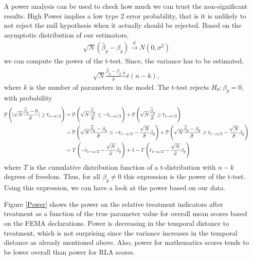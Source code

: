 A power analysis can be used to check how much we can trust the non-significant results. High Power implies a low type 2 error probability, that is it is unlikely to not reject the null hypothesis when it actually should be rejected. Based on the asymptotic distribution of our estimators,
\begin{align*}
	\sqrt{N} (\widehat{\beta}_{g} - \beta_{g}) \overset{d}{\to} N(0, \sigma^2)
\end{align*}
we can compute the power of the t-test. Since, the variance has to be estimated, 
\begin{align*}
	\sqrt{N} \frac{\widehat{\beta}_{g} - \beta_{g}}{\widehat{\sigma}} \overset{a}{\sim} t(n-k),
\end{align*}
where $k$ is the number of parameters in the model. The t-test rejects $H_0: \beta_g = 0$, with probability
\begin{align*}
	\mathbb{P} \left( \lvert \sqrt{N} \frac{\widehat{\beta}_{g} - 0}{\widehat{\sigma}} \rvert \geq t_{1-\alpha/2}  \right) &= \mathbb{P} \left(  \sqrt{N} \frac{\widehat{\beta}_{g}}{\widehat{\sigma}}  \leq -t_{1-\alpha/2}  \right) + \mathbb{P} \left( \sqrt{N} \frac{\widehat{\beta}_{g}}{\widehat{\sigma}} \geq t_{1-\alpha/2}  \right) \\
	&= \mathbb{P} \left(  \sqrt{N} \frac{\widehat{\beta}_{g} - \beta_g}{\widehat{\sigma}}  \leq -t_{1-\alpha/2} - \frac{\sqrt{N}}{\widehat{\sigma}} \beta_{g}  \right) + \mathbb{P} \left( \sqrt{N} \frac{\widehat{\beta}_{g} - \beta_g}{\widehat{\sigma}} \geq t_{1-\alpha/2}  - \frac{\sqrt{N}}{\widehat{\sigma}} \beta_{g} \right) \\
	&= T\left( -t_{1-\alpha/2} - \frac{\sqrt{N}}{\widehat{\sigma}} \beta_{g} \right) + 1 - T \left(  t_{1-\alpha/2}  - \frac{\sqrt{N}}{\widehat{\sigma}} \beta_{g} \right)
\end{align*}
where $T$ is the cumulative distribution function of a t-distribution with $n-k$ degrees of freedom. Thus, for all $\beta_g \neq 0$ this expression is the power of the t-test. Using this expression, we can have a look at the power based on our data.

Figure \ref{Power} shows the power on the relative treatment indicators after treatment as a function of the true parameter value for overall mean scores based on the FEMA declarations. Power is decreasing in the temporal distance to treatment, which is not surprising since the variance increases in the temporal distance as already mentioned above. Also, power for mathematics scores tends to be lower overall than power for RLA scores. 



